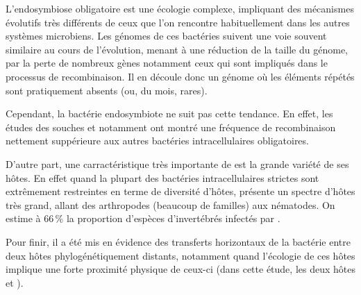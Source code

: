 L’endosymbiose obligatoire est une écologie complexe, impliquant des mécanismes évolutifs très différents de ceux que l’on rencontre habituellement dans les autres systèmes microbiens.
Les génomes de ces bactéries suivent une voie souvent similaire au cours de l’évolution, menant à une réduction de la taille du génome, par la perte de nombreux gènes\cite{wernegreen2002} notamment ceux qui sont impliqués dans le processus de recombinaison.
Il en découle donc un génome où les éléments répétés sont pratiquement absents (ou, du mois, rares\cite{Bordenstein2005}).

Cependant, la bactérie endosymbiote  ne suit pas cette tendance. En effet, les études des souches  et  notamment ont montré une fréquence de recombinaison nettement suppérieure aux autres bactéries intracellulaires obligatoires\cite{Wu2004}.

D’autre part, une carractéristique très importante de  est la grande variété de ses hôtes. En effet quand la plupart des bactéries intracellulaires strictes sont extrêmement restreintes en terme de diversité d’hôtes,  présente un spectre d’hôtes très grand, allant des arthropodes (beaucoup de familles) aux nématodes. On estime à 66\,\% la proportion d’espèces d’invertébrés infectés par \cite{hilgenboecker2008}.

Pour finir, il a été mis en évidence \cite{vavre1999} des transferts horizontaux de la bactérie entre deux hôtes phylogénétiquement distants, notamment quand l’écologie de ces hôtes implique une forte proximité physique de ceux-ci (dans cette étude, les deux hôtes  et ).
